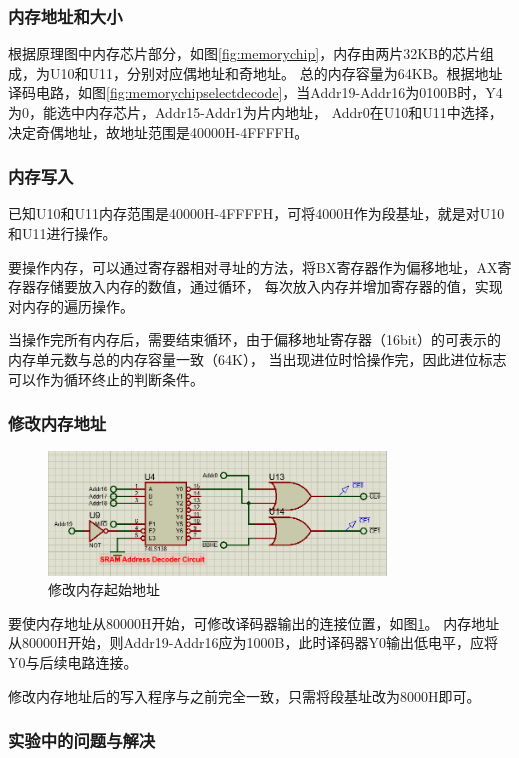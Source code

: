 \documentclass[12pt, a4paper, oneside]{ctexart}
\begin{document}
    \subsubsection{内存地址和大小}
    根据原理图中内存芯片部分，如图\ref{fig:memorychip}，内存由两片32KB的芯片组成，为U10和U11，分别对应偶地址和奇地址。
    总的内存容量为64KB。根据地址译码电路，如图\ref{fig:memorychipselectdecode}，当Addr19-Addr16为0100B时，Y4为0，能选中内存芯片，Addr15-Addr1为片内地址，
    Addr0在U10和U11中选择，决定奇偶地址，故地址范围是40000H-4FFFFH。
    \subsubsection{内存写入}
    已知U10和U11内存范围是40000H-4FFFFH，可将4000H作为段基址，就是对U10和U11进行操作。

    要操作内存，可以通过寄存器相对寻址的方法，将BX寄存器作为偏移地址，AX寄存器存储要放入内存的数值，通过循环，
    每次放入内存并增加寄存器的值，实现对内存的遍历操作。

    当操作完所有内存后，需要结束循环，由于偏移地址寄存器（16bit）的可表示的内存单元数与总的内存容量一致（64K），
    当出现进位时恰操作完，因此进位标志可以作为循环终止的判断条件。
    \subsubsection{修改内存地址}
    \begin{figure}[!h]
        \centering
        \includegraphics[width=0.8\textwidth]{img/newmemoryaddr.png}
        \caption{修改内存起始地址}
        \label{fig:newmemoryaddr}
    \end{figure}
    要使内存地址从80000H开始，可修改译码器输出的连接位置，如图\ref{fig:newmemoryaddr}。
    内存地址从80000H开始，则Addr19-Addr16应为1000B，此时译码器Y0输出低电平，应将Y0与后续电路连接。

    修改内存地址后的写入程序与之前完全一致，只需将段基址改为8000H即可。
    \subsubsection{实验中的问题与解决}
\end{document}
